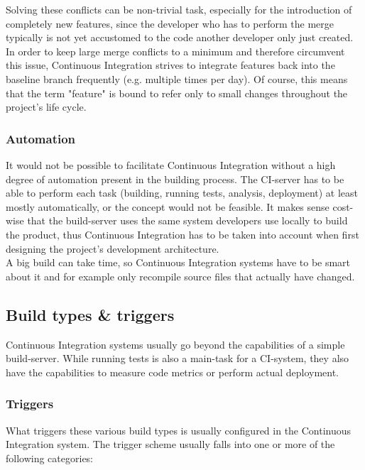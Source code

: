 Solving these conflicts can be non-trivial task, especially for the introduction
of completely new features, since the developer who has to perform the merge
typically is not yet accustomed to the code another developer only just
created.\\

In order to keep large merge conflicts to a minimum and therefore circumvent
this issue, Continuous Integration strives to integrate features back into the
baseline branch frequently (e.g. multiple times per day).  Of course, this means
that the term "feature" is bound to refer only to small changes throughout the
project's life cycle.

\subsubsection{Automation}\label{sec:automation}

It would not be possible to facilitate Continuous Integration without a high
degree of automation present in the building process. The CI-server has to be
able to perform each task (building, running tests, analysis, deployment) at
least mostly automatically, or the concept would not be feasible. It makes sense
cost-wise that the build-server uses the same system developers use locally to
build the product, thus Continuous Integration has to be taken into account when
first designing the project's development architecture.\\

A big build can take time, so Continuous Integration systems have to be smart
about it and for example only recompile source files that actually have changed.

\subsection{Build types \& triggers}\label{sec:build-types-triggers}

Continuous Integration systems usually go beyond the capabilities of a simple
build-server. While running tests is also a main-task for a CI-system, they also
have the capabilities to measure code metrics or perform actual deployment.

\subsubsection{Triggers}\label{sec:triggers}

What triggers these various build types is usually configured in the Continuous
Integration system. The trigger scheme usually falls into one or more of the
following categories:

